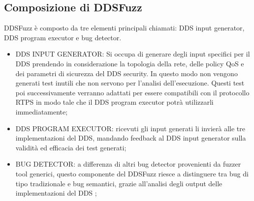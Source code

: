 \subsection{Composizione di DDSFuzz}
DDSFuzz è composto da tre elementi principali chiamati: 
DDS input generator, DDS program executor e bug detector.
\begin{itemize}
    \item DDS INPUT GENERATOR: Si occupa di generare degli input 
    specifici per il DDS prendendo in considerazione la topologia
    della rete, delle policy QoS e dei parametri di sicurezza del 
    DDS security. In questo modo non vengono generati test inutili 
    che non servono per l'analisi dell'esecuzione. 
    Questi test poi successivamente verranno adattati per essere 
    compatibili con il 
    protocollo RTPS in modo tale che il DDS program executor
    potrà utilizzarli
    immediatamente;
    \item DDS PROGRAM EXECUTOR: ricevuti gli input generati 
    li invierà alle
    tre implementazioni del DDS, mandando feedback  al DDS input generator
    sulla validità ed efficacia dei test generati;
    \item BUG DETECTOR: a differenza di altri bug detector provenienti da 
    fuzzer tool generici, questo componente del DDSFuzz riesce
    a distinguere tra bug 
    di tipo tradizionale e bug semantici, grazie all'analisi
    degli output delle implementazioni del DDS
    \cite{10.1145/3691620.3695073};
\end{itemize}